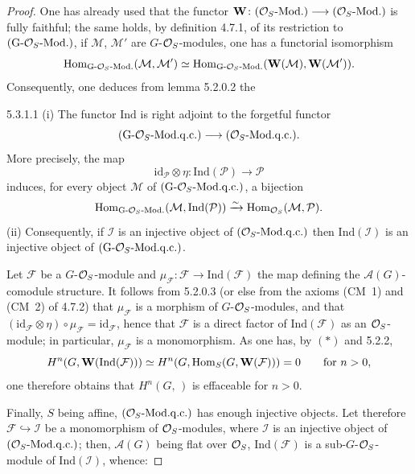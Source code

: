 \begin{proof}
One has already used that the functor
\(\mathbf{W}\colon(\mathcal{O}_S\text{-}\mathrm{Mod.})\longrightarrow(\mathcal{O}_S\text{-}\mathrm{Mod.})\) is
fully faithful; the same holds, by definition 4.7.1, of its restriction to
\((\mathrm{G}\text{-}\mathcal{O}_S\text{-}\mathrm{Mod.})\), \ie if \(\mathcal{M}\),
\(\mathcal{M}'\) are \(G\)-\(\mathcal{O}_S\)-modules, one has a functorial isomorphism
\[
\operatorname{Hom}_{\mathrm{G}\text{-}\mathcal{O}_S\text{-}\mathrm{Mod.}}(\mathcal{M},\mathcal{M}')
\simeq
\operatorname{Hom}_{\mathrm{G}\text{-}\mathcal{O}_S\text{-}\mathrm{Mod.}}(\mathbf{W}(\mathcal{M}),\mathbf{W}(\mathcal{M}')).
\]
Consequently, one deduces from lemma 5.2.0.2 the

\begin{corollary}{5.3.1.1}
\label{I.5.3.1.1}
(i) The functor \(\mathrm{Ind}\) is right adjoint to the forgetful functor
\[
(\mathrm{G}\text{-}\mathcal{O}_S\text{-}\mathrm{Mod.q.c.})\longrightarrow(\mathcal{O}_S\text{-}\mathrm{Mod.q.c.}).
\]
More precisely, the map
\[
\mathrm{id}_{\mathcal{P}}\otimes\eta\colon\mathrm{Ind}(\mathcal{P})\to\mathcal{P}
\]
induces, for every object \(\mathcal{M}\) of
\((\mathrm{G}\text{-}\mathcal{O}_S\text{-}\mathrm{Mod.q.c.})\), a bijection
\[
\operatorname{Hom}_{\mathrm{G}\text{-}\mathcal{O}_S\text{-}\mathrm{Mod.}}(\mathcal{M},\mathrm{Ind}(\mathcal{P}))
\xrightarrow{\sim}
\operatorname{Hom}_{\mathcal{O}_S}(\mathcal{M},\mathcal{P}).
\]
(ii) Consequently, if \(\mathcal{I}\) is an injective object of
\((\mathcal{O}_S\text{-}\mathrm{Mod.q.c.})\) then \(\mathrm{Ind}(\mathcal{I})\) is an
injective object of \((\mathrm{G}\text{-}\mathcal{O}_S\text{-}\mathrm{Mod.q.c.})\).
\end{corollary}

Let \(\mathcal{F}\) be a \(G\)-\(\mathcal{O}_S\)-module and
\(\mu_{\mathcal{F}}\colon\mathcal{F}\to\mathrm{Ind}(\mathcal{F})\) the map
defining the \(\mathcal{A}(G)\)-comodule structure. It follows from 5.2.0.3
(or else from the axioms (CM~1) and (CM~2) of 4.7.2) that \(\mu_{\mathcal{F}}\)
is a morphism of \(G\)-\(\mathcal{O}_S\)-modules, and that
\((\mathrm{id}_{\mathcal{F}}\otimes\eta)\circ\mu_{\mathcal{F}}=\mathrm{id}_{\mathcal{F}}\),
hence that \(\mathcal{F}\) is a direct factor of \(\mathrm{Ind}(\mathcal{F})\)
as an \(\mathcal{O}_S\)-module; in particular, \(\mu_{\mathcal{F}}\) is a monomorphism.
As one has, by \((*)\) and 5.2.2,
\[
H^{n}(G,\mathbf{W}(\mathrm{Ind}(\mathcal{F})))
\simeq
H^{n}(G,\operatorname{Hom}_{S}(G,\mathbf{W}(\mathcal{F})))
=0
\qquad\text{for }n>0,
\]
one therefore obtains that \(H^{n}(G,\,)\) is effaceable for \(n>0\).

Finally, \(S\) being affine, \((\mathcal{O}_S\text{-}\mathrm{Mod.q.c.})\) has enough
injective objects. Let therefore \(\mathcal{F}\hookrightarrow\mathcal{I}\) be a
monomorphism of \(\mathcal{O}_S\)-modules, where \(\mathcal{I}\) is an injective object
of \((\mathcal{O}_S\text{-}\mathrm{Mod.q.c.})\); then, \(\mathcal{A}(G)\) being flat over
\(\mathcal{O}_S\), \(\mathrm{Ind}(\mathcal{F})\) is a sub-\(G\)-\(\mathcal{O}_S\)-module of
\(\mathrm{Ind}(\mathcal{I})\), whence:


\end{proof}
